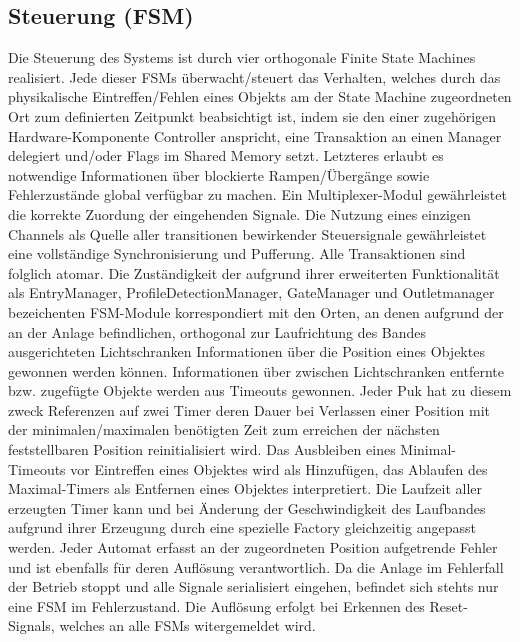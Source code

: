 \documentclass[
   draft=false
  ,paper=a4
  ,twoside=true
  ,fontsize=11pt
  ,headsepline
  ,DIV11
  ,parskip=full+
]{scrartcl} %
\begin{document}
\subsection{Steuerung (FSM)}
Die Steuerung des Systems ist durch vier orthogonale Finite State Machines realisiert. Jede dieser FSMs überwacht/steuert das Verhalten, welches durch das physikalische Eintreffen/Fehlen eines Objekts am der State Machine zugeordneten Ort zum definierten Zeitpunkt beabsichtigt ist, indem sie den einer zugehörigen Hardware-Komponente Controller anspricht, eine Transaktion an einen Manager delegiert und/oder Flags im Shared Memory setzt. Letzteres erlaubt es notwendige Informationen über blockierte Rampen/Übergänge sowie Fehlerzustände global verfügbar zu machen.
\newline
\newline
Ein Multiplexer-Modul gewährleistet die korrekte Zuordung der eingehenden Signale. Die Nutzung eines einzigen Channels als Quelle aller transitionen bewirkender Steuersignale gewährleistet eine vollständige Synchronisierung und Pufferung. Alle Transaktionen sind folglich atomar.
\newline
Die Zuständigkeit der aufgrund ihrer erweiterten Funktionalität als EntryManager, ProfileDetectionManager, GateManager und Outletmanager bezeichenten FSM-Module korrespondiert mit den Orten, an denen aufgrund der an der Anlage befindlichen, orthogonal zur Laufrichtung des Bandes ausgerichteten Lichtschranken Informationen über die Position eines Objektes gewonnen werden können.
\newline
Informationen über zwischen Lichtschranken entfernte bzw. zugefügte Objekte werden aus Timeouts gewonnen. Jeder Puk hat zu diesem zweck Referenzen auf zwei Timer deren Dauer bei Verlassen einer Position mit der minimalen/maximalen benötigten Zeit zum erreichen der nächsten feststellbaren Position reinitialisiert wird.
Das Ausbleiben eines Minimal-Timeouts vor Eintreffen eines Objektes wird als Hinzufügen, das Ablaufen des Maximal-Timers als Entfernen eines Objektes interpretiert. 
\newline
Die Laufzeit aller erzeugten Timer kann und bei Änderung der Geschwindigkeit des Laufbandes aufgrund ihrer Erzeugung durch eine spezielle Factory gleichzeitig angepasst werden.
\newline 
\newline
Jeder Automat erfasst an der zugeordneten Position aufgetrende Fehler und ist ebenfalls für deren Auflösung verantwortlich. Da die Anlage im Fehlerfall der Betrieb stoppt und alle Signale serialisiert eingehen, befindet sich stehts nur eine FSM im Fehlerzustand. Die Auflösung erfolgt bei Erkennen des Reset-Signals, welches an alle FSMs witergemeldet wird.
\end{document}
